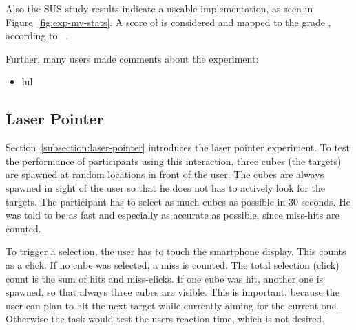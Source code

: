 Also the \ac{SUS} study results indicate a useable implementation, as seen in Figure~\ref{fig:exp-mv-stats}. A score of \evalExpMvSusScore{} is considered \evalExpMvSusAdj{} and mapped to the grade \evalExpMvSusGrade, according to \citeauthor{Bangor.2009}~\cite[120\psq]{Bangor.2009}.


Further, many users made comments about the experiment:

\begin{itemize}
  \item lul
\end{itemize}




\subsection{Laser Pointer}\label{section:eval-res-lp}

Section~\ref{subsection:laser-pointer} introduces the laser pointer experiment. To test the performance of participants using this interaction, three cubes (the targets) are spawned at random locations in front of the user. The cubes are always spawned in sight of the user so that he does not has to actively look for the targets. The participant has to select as much cubes as possible in 30 seconds. He was told to be as fast and especially as accurate as possible, since miss-hits are counted. 

To trigger a selection, the user has to touch the smartphone display. This counts as a click. If no cube was selected, a miss is counted. The total selection (click) count is the sum of hits and miss-clicks. If one cube was hit, another one is spawned, so that always three cubes are visible. This is important, because the user can plan to hit the next target while currently aiming for the current one. Otherwise the task would test the users reaction time, which is not desired. 

